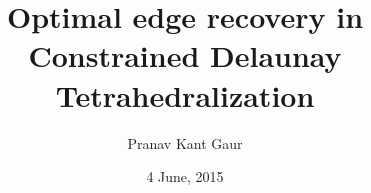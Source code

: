 \documentclass{beamer}
\title{Optimal edge recovery in Constrained Delaunay Tetrahedralization}
\author{Pranav Kant Gaur}
\institute{Computer graphics and Visualization section, \newline Computer Division}
\date{4 June, 2015}
\begin{document}
\begin{frame}
\titlepage
\end{frame}
\end{document}
